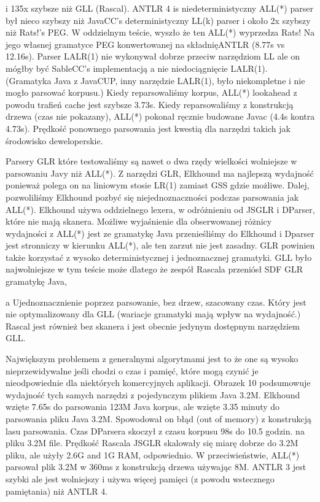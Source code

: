 i 135x szybsze niż GLL (Rascal). ANTLR 4 is niedeterministyczny ALL(*) parser
był nieco szybszy niż JavaCC’s deterministyczny LL(k) parser i około
2x szybszy niż Rats!’s PEG. W oddzielnym teście, wyszło że ten ALL(*)
wyprzedza Rats! Na jego własnej gramatyce PEG konwertowanej na składnięANTLR
(8.77s vs 12.16s).
Parser LALR(1) nie wykonywał dobrze przeciw narzędziom LL ale on mógłby
być SableCC’s implementacją a nie niedociągnięcie LALR(1). (Gramatyka Java z JavaCUP,
inny narzędzie LALR(1), było niekompletne i nie mogło parsować korpusu.)
Kiedy reparsowaliśmy korpus, ALL(*) lookahead z powodu trafień cache jest
szybsze 3.73s. Kiedy reparsowaliśmy z konstrukcją drzewa (czas nie pokazany),
ALL(*) pokonał ręcznie budowane Javac (4.4s kontra 4.73s).
Prędkość ponownego parsowania jest kwestią dla narzędzi takich jak środowisko deweloperskie.
\par
Parsery GLR które testowaliśmy są nawet o dwa rzędy wielkości wolniejsze w
parsowaniu Javy niż ALL(*). Z narzędzi GLR,
Elkhound ma najlepszą wydajność ponieważ polega on na liniowym stosie
LR(1) zamiast GSS gdzie możliwe.
Dalej, pozwoliliśmy Elkhound pozbyć się niejednoznaczności podczas
parsowania jak ALL(*). Elkhound używa oddzielnego lexera, w odróżnieniu od
JSGLR i DParser, które nie mają skanera.
Możliwe wyjaśnienie dla obserwowanej różnicy wydajności z ALL(*) jest
ze gramatykę Java przenieśliśmy do Elkhound i Dparser jest
stronniczy w kierunku ALL(*), ale ten zarzut nie jest zasadny.
GLR powinien także korzystać z wysoko deterministycznej i jednoznacznej gramatyki.
GLL było najwolniejsze w tym teście może dlatego że zespół Rascala przeniósł SDF GLR gramatykę Java,

a
Ujednoznacznienie poprzez parsowanie, bez drzew, szacowany czas.
Który jest nie optymalizowany dla GLL (wariacje gramatyki mają wpływ na wydajność.)
Rascal jest również bez skanera i jest obecnie jedynym dostępnym narzędziem GLL.
\par
Największym problemem z generalnymi algorytmami jest to że one są wysoko nieprzewidywalne
jeśli chodzi o czas i pamięć, które mogą czynić je nieodpowiednie dla
niektórych komercyjnych aplikacji. Obrazek 10 podsumowuje wydajność tych
samych narzędzi z pojedynczym plikiem Java 3.2M. Elkhound wzięte 7.65s do parsowania 123M Java
korpus, ale wzięte 3.35 minuty do parsowania pliku Java 3.2M. Spowodował on
błąd (out of memory) z konstrukcją lasu parsowania.
Czas DParsera skoczył z czasu korpusu 98s do 10.5 godzin.
na pliku 3.2M file. Prędkość Rascala JSGLR skalowały się miarę dobrze do 3.2M pliku,
ale użyły 2.6G and 1G RAM, odpowiednio.
W przeciwieństwie, ALL(*) parsował plik 3.2M w 360ms z konstrukcją drzewa używając 8M.
ANTLR 3 jest szybki ale jest wolniejszy i używa więcej pamięci (z powodu wstecznego pamiętania) niż ANTLR 4.
